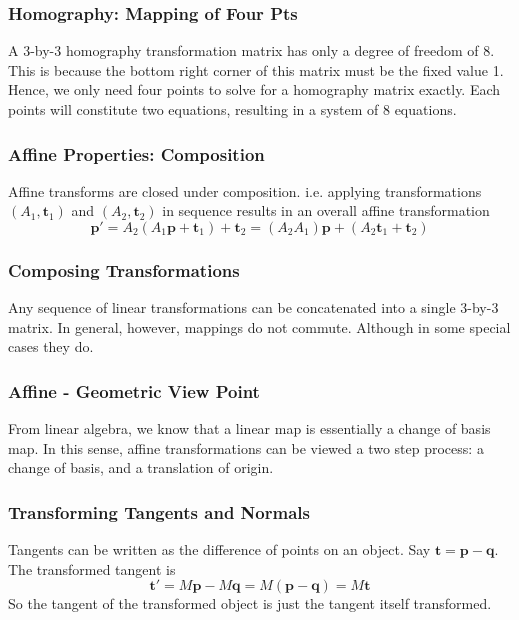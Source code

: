 \documentclass[11pt]{article}
\newcommand{\bp}{\mathbf{p}}
\newcommand{\bq}{\mathbf{q}}
\newcommand{\bt}{\mathbf{t}}
\begin{document}
\subsubsection{Homography: Mapping of Four Pts}
A 3-by-3 homography transformation matrix has only a degree of freedom of 8. This is because the bottom right corner of this matrix must be the fixed value 1. Hence, we only need four points to solve for a homography matrix exactly. Each points will constitute two equations, resulting in a system of 8 equations. 

\subsubsection{Affine Properties: Composition}
Affine transforms are closed under composition. i.e. applying transformations $(A_1, \bt_1)$ and $(A_2, \bt_2)$ in sequence results in an overall affine transformation
\begin{equation}
	\bp' = A_2 (A_1 \bp + \bt_1) + \bt_2 = (A_2A_1) \bp + (A_2\bt_1 + \bt_2) 
\end{equation}

\subsubsection{Composing Transformations}
Any sequence of linear transformations can be concatenated into a single 3-by-3 matrix. In general, however, mappings do not commute. Although in some special cases they do. 

\subsubsection{Affine - Geometric View Point}
From linear algebra, we know that a linear map is essentially a change of basis map. In this sense, affine transformations can be viewed a two step process: a change of basis, and a translation of origin. 

\subsubsection{Transforming Tangents and Normals}
Tangents can be written as the difference of points on an object. Say $\bt = \bp - \bq$. The transformed tangent is 
\begin{equation}
	\bt' = M\bp - M \bq = M(\bp - \bq) = M\bt
\end{equation}
So the tangent of the transformed object is just the tangent itself transformed. 
\end{document}
